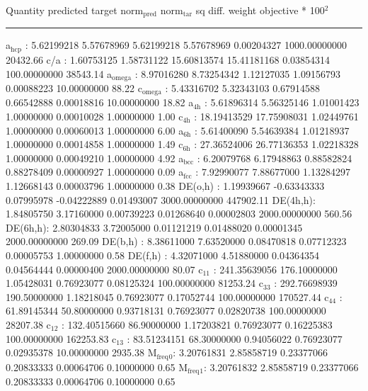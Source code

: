 \documentclass[11pt]{article}
\begin{document}
Quantity      predicted    target     norm\(_{\text{pred}}\)   norm\(_{\text{tar}}\)    sq diff.      weight    objective * 100\(^{\text{2}}\) 

\noindent\rule{\textwidth}{0.5pt}
a\(_{\text{hcp}}\)   :   5.62199218   5.57678969   5.62199218   5.57678969   0.00204327 1000.00000000     20432.66
c/a     :   1.60753125   1.58731122  15.60813574  15.41181168   0.03854314 100.00000000     38543.14
a\(_{\text{omega}}\) :   8.97016280   8.73254342   1.12127035   1.09156793   0.00088223  10.00000000        88.22
c\(_{\text{omega}}\) :   5.43316702   5.32343103   0.67914588   0.66542888   0.00018816  10.00000000        18.82
a\(_{\text{4h}}\)    :   5.61896314   5.56325146   1.01001423   1.00000000   0.00010028   1.00000000         1.00
c\(_{\text{4h}}\)    :  18.19413529  17.75908031   1.02449761   1.00000000   0.00060013   1.00000000         6.00
a\(_{\text{6h}}\)    :   5.61400090   5.54639384   1.01218937   1.00000000   0.00014858   1.00000000         1.49
c\(_{\text{6h}}\)    :  27.36524006  26.77136353   1.02218328   1.00000000   0.00049210   1.00000000         4.92
a\(_{\text{bcc}}\)   :   6.20079768   6.17948863   0.88582824   0.88278409   0.00000927   1.00000000         0.09
a\(_{\text{fcc}}\)   :   7.92990077   7.88677000   1.13284297   1.12668143   0.00003796   1.00000000         0.38
DE(o,h) :   1.19939667  -0.63343333   0.07995978  -0.04222889   0.01493007 3000.00000000    447902.11
DE(4h,h):   1.84805750   3.17160000   0.00739223   0.01268640   0.00002803 2000.00000000       560.56
DE(6h,h):   2.80304833   3.72005000   0.01121219   0.01488020   0.00001345 2000.00000000       269.09
DE(b,h) :   8.38611000   7.63520000   0.08470818   0.07712323   0.00005753   1.00000000         0.58
DE(f,h) :   4.32071000   4.51880000   0.04364354   0.04564444   0.00000400 2000.00000000        80.07
c\(_{\text{11}}\)    : 241.35639056 176.10000000   1.05428031   0.76923077   0.08125324 100.00000000     81253.24
c\(_{\text{33}}\)    : 292.76698939 190.50000000   1.18218045   0.76923077   0.17052744 100.00000000    170527.44
c\(_{\text{44}}\)    :  61.89145344  50.80000000   0.93718131   0.76923077   0.02820738 100.00000000     28207.38
c\(_{\text{12}}\)    : 132.40515660  86.90000000   1.17203821   0.76923077   0.16225383 100.00000000    162253.83
c\(_{\text{13}}\)    :  83.51234151  68.30000000   0.94056022   0.76923077   0.02935378  10.00000000      2935.38
M\(_{\text{freq}}\)\(_{\text{0}}\):   3.20761831   2.85858719   0.23377066   0.20833333   0.00064706   0.10000000         0.65
M\(_{\text{freq}}\)\(_{\text{1}}\):   3.20761832   2.85858719   0.23377066   0.20833333   0.00064706   0.10000000         0.65
\end{document}

